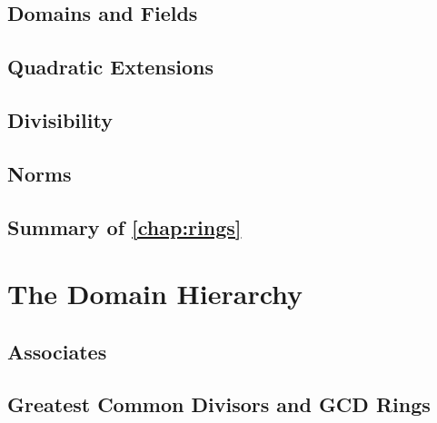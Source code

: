 \documentclass{memoir}
\begin{document}
    \section{Domains and Fields}
      \label{sec:domains-and-fields}
      
      \newpage

    \section{Quadratic Extensions}
      \label{sec:quad-ext}
      
      \newpage

    \section{Divisibility}
      \label{sec:divisibility}
      
      \newpage

    \section{Norms}
      \label{sec:norms}
      
      \newpage

    \section*{Summary of \autoref{chap:rings}}
      


  \chapter{The Domain Hierarchy}
    \label{chap:domains}
    
    \newpage

    \section{Associates}
      \label{sec:associates}
      
      \newpage

    \section{Greatest Common Divisors and GCD Rings}
      \label{sec:gcd-rings}
      
      \newpage
\end{document}
